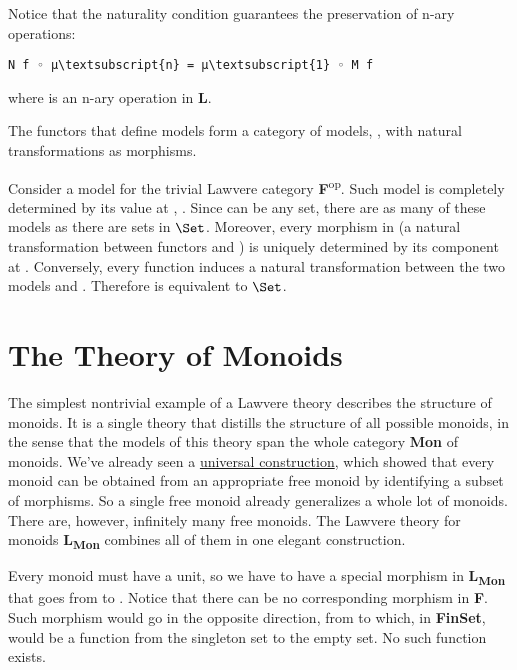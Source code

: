 Notice that the naturality condition guarantees the preservation of
n-ary operations:

\begin{Verbatim}[commandchars=\\\{\}]
N f ◦ μ\textsubscript{n} = μ\textsubscript{1} ◦ M f
\end{Verbatim}
where  is an n-ary operation in
\textbf{L}.

The functors that define models form a category of models,
, with natural transformations as morphisms.

Consider a model for the trivial Lawvere category
\textbf{F}\textsuperscript{op}. Such model is completely determined by
its value at , . Since  can be any
set, there are as many of these models as there are sets in
$\Set$. Moreover, every morphism in  (a
natural transformation between functors  and ) is
uniquely determined by its component at . Conversely, every
function  induces a natural
transformation between the two models  and .
Therefore  is equivalent to $\Set$.

\section{The Theory of Monoids}\label{the-theory-of-monoids}

The simplest nontrivial example of a Lawvere theory describes the
structure of monoids. It is a single theory that distills the structure
of all possible monoids, in the sense that the models of this theory
span the whole category \textbf{Mon} of monoids. We've already seen a
\hyperref[chap-free-monoids]{universal
construction}, which showed that every monoid can be obtained from an
appropriate free monoid by identifying a subset of morphisms. So a
single free monoid already generalizes a whole lot of monoids. There
are, however, infinitely many free monoids. The Lawvere theory for
monoids \textbf{L\textsubscript{Mon}} combines all of them in one
elegant construction.

Every monoid must have a unit, so we have to have a special morphism
 in \textbf{L\textsubscript{Mon}} that goes from  to
. Notice that there can be no corresponding morphism in
\textbf{F}. Such morphism would go in the opposite direction, from
 to  which, in \textbf{FinSet}, would be a function
from the singleton set to the empty set. No such function exists.

